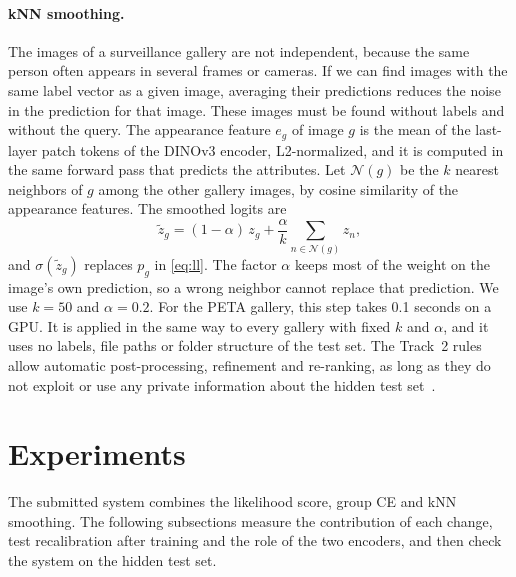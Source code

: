\documentclass[10pt,twocolumn,letterpaper]{article}
\begin{document}
\paragraph{kNN smoothing.} The images of a surveillance gallery are not independent, because the same person often appears in several frames or cameras. If we can find images with the same label vector as a given image, averaging their predictions reduces the noise in the prediction for that image. These images must be found without labels and without the query. The appearance feature $e_g$ of image $g$ is the mean of the last-layer patch tokens of the DINOv3 encoder, L2-normalized, and it is computed in the same forward pass that predicts the attributes. Let $\mathcal{N}(g)$ be the $k$ nearest neighbors of $g$ among the other gallery images, by cosine similarity of the appearance features. The smoothed logits are
\begin{equation}
\tilde z_g=(1-\alpha)\,z_g+\frac{\alpha}{k}\sum_{n\in\mathcal{N}(g)}z_n,
\label{eq:knn}
\end{equation}
and $\sigma(\tilde z_g)$ replaces $p_g$ in \cref{eq:ll}. The factor $\alpha$ keeps most of the weight on the image's own prediction, so a wrong neighbor cannot replace that prediction. We use $k=50$ and $\alpha=0.2$. For the PETA gallery, this step takes 0.1 seconds on a GPU. It is applied in the same way to every gallery with fixed $k$ and $\alpha$, and it uses no labels, file paths or folder structure of the test set. The Track~2 rules allow automatic post-processing, refinement and re-ranking, as long as they do not exploit or use any private information about the hidden test set~\cite{rules}.

\section{Experiments}
\label{sec:exp}

The submitted system combines the likelihood score, group CE and kNN smoothing. The following subsections measure the contribution of each change, test recalibration after training and the role of the two encoders, and then check the system on the hidden test set.
\end{document}
